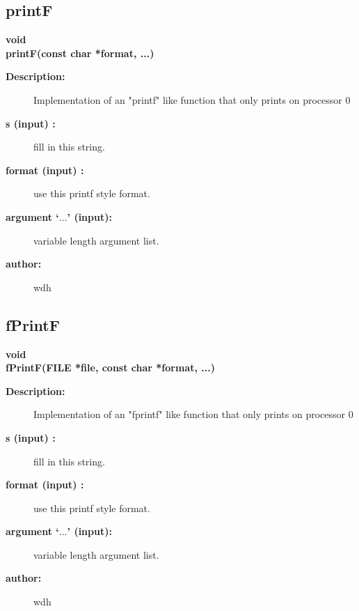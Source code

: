 \subsection{printF}
 
\begin{flushleft} \textbf{%
void \\ 
\settowidth{\otherStuffIncludeArgIndent}{printF(}%
printF(const char *format, ...)
}\end{flushleft}
\begin{description}
\item[{\bf Description:}] 
    Implementation of an "printf" like function that only prints on processor 0
 
\item[{\bf s (input) :}]  fill in this string.
\item[{\bf format (input) :}]  use this printf style format.
\item[{\bf argument `$\ldots$' (input):}]  variable length argument list.
 
\item[{\bf author:}]  wdh
\end{description}
\subsection{fPrintF}
 
\begin{flushleft} \textbf{%
void \\ 
\settowidth{\otherStuffIncludeArgIndent}{fPrintF(}%
fPrintF(FILE *file, const char *format, ...)
}\end{flushleft}
\begin{description}
\item[{\bf Description:}] 
    Implementation of an "fprintf" like function that only prints on processor 0
 
\item[{\bf s (input) :}]  fill in this string.
\item[{\bf format (input) :}]  use this printf style format.
\item[{\bf argument `$\ldots$' (input):}]  variable length argument list.
 
\item[{\bf author:}]  wdh
\end{description}
